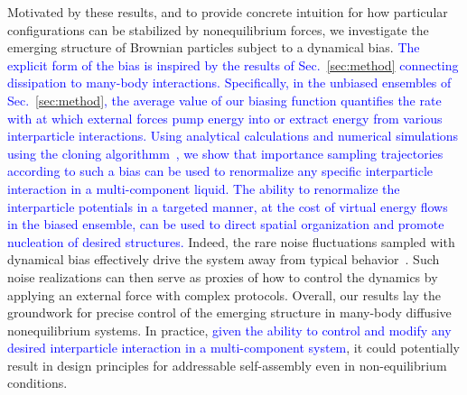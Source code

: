 \documentclass[superscriptaddress, twocolumn, prx, longbibliography, nofootinbib]{revtex4-1}
\begin{document}
Motivated by these results, and to provide concrete intuition for how particular configurations can be stabilized by nonequilibrium forces, we investigate the emerging structure of Brownian particles subject to a dynamical bias. \textcolor{blue}{The explicit form of the bias is inspired by the results of Sec.~\ref{sec:method} connecting dissipation to many-body interactions. Specifically, in the unbiased ensembles of Sec.~\ref{sec:method}, the average value of our biasing function quantifies the rate with at which external forces pump energy into or extract energy from various interparticle interactions. Using analytical calculations and numerical simulations using the cloning algorithmm~\cite{Giadina2006, tailleur2007probing, Hurtado2009, Nemoto2016, Ray2018, Klymko2018, Brewer2018}, we show that importance sampling trajectories according to such a bias can be used to renormalize any specific interparticle interaction in a multi-component liquid. The ability to renormalize the interparticle potentials in a targeted manner, at the cost of virtual energy flows in the biased ensemble, can be used to direct spatial organization and promote nucleation of desired structures.} Indeed, the rare noise fluctuations sampled with dynamical bias effectively drive the system away from typical behavior~\cite{garrahan2007, Hedges2009, Jack2010, Pitard2011, Speck2012, Bodineau2012a, Chetrite2013, Limmer2014, Nemoto2017}. Such noise realizations can then serve as proxies of how to control the dynamics by applying an external force with complex protocols. Overall, our results lay the groundwork for precise control of the emerging structure in many-body diffusive nonequilibrium systems. In practice, \textcolor{blue}{given the ability to control and modify any desired interparticle interaction in a multi-component system}, it could potentially result in design principles for addressable self-assembly even in non-equilibrium conditions.



\end{document}
